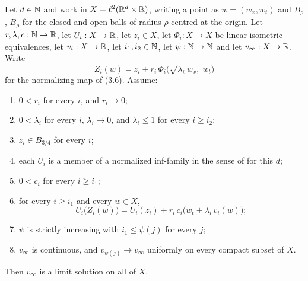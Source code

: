 \begin{lemma}
Let $d\in\mathbb{N}$ and work in $X=\ell^2(\mathbb{R}^d\times\mathbb{R})$, writing a point as
$w=(w_x,w_t)$ and $\overline B_\rho$, $B_\rho$ for the closed and open balls of
radius $\rho$ centred at the origin. Let $r,\lambda,c:\mathbb{N}\to\mathbb{R}$, let
$U_i:X\to\mathbb{R}$, let $z_i\in X$, let
$\Phi_i:X\to X$ be linear isometric equivalences, let $v_i:X\to\mathbb{R}$, let
$i_1,i_2\in\mathbb{N}$, let $\psi:\mathbb{N}\to\mathbb{N}$ and let $v_\infty:X\to\mathbb{R}$. Write
\[
  Z_i(w)=z_i+r_i\,\Phi_i\bigl(\sqrt{\lambda_i}\,w_x,\;w_t\bigr)
\]
for the normalizing map of (3.6). Assume:
\begin{enumerate}
\item\label{it:nlls-r} $0<r_i$ for every $i$, and $r_i\to0$;
\item\label{it:nlls-lam} $0<\lambda_i$ for every $i$, $\lambda_i\to0$, and
$\lambda_i\le1$ for every $i\ge i_2$;
\item\label{it:nlls-z} $z_i\in B_{3/4}$ for every $i$;
\item\label{it:nlls-fam} each $U_i$ is a member of a normalized inf-family in
the sense of  for this $d$;
\item\label{it:nlls-c} $0<c_i$ for every $i\ge i_1$;
\item\label{it:nlls-eq} for every $i\ge i_1$ and every $w\in X$,
\begin{equation}\label{eq:nlls-incr}
  U_i\bigl(Z_i(w)\bigr)
  =U_i(z_i)+r_i\,c_i\bigl(w_t+\lambda_i\,v_i(w)\bigr);
\end{equation}
\item\label{it:nlls-psi} $\psi$ is strictly increasing with $i_1\le\psi(j)$ for
every $j$;
\item\label{it:nlls-conv} $v_\infty$ is continuous, and $v_{\psi(j)}\to
v_\infty$ uniformly on every compact subset of $X$.
\end{enumerate}
Then $v_\infty$ is a limit solution on all of $X$.
\end{lemma}
